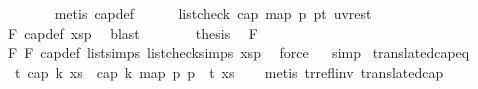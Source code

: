 \begin{isabellebody}
\ \ \ \ \ \ \isamarkupfalse%
\ {\isacharparenleft}{\kern0pt}metis\ cap{}{\isacharunderscore}{\kern0pt}def{\isacharparenright}{\kern0pt}\isanewline
\ \ \ \ \isamarkupfalse%
\ {\isachardoublequoteopen}list{\isacharunderscore}{\kern0pt}check\ cap{}\ {\isacharparenleft}{\kern0pt}map\ {\isacharparenleft}{\kern0pt}{\isasymlambda}p{\isachardot}{\kern0pt}\ p{\isacharplus}{\kern0pt}t{\isacharparenright}{\kern0pt}\ {\isacharparenleft}{\kern0pt}u{\isacharhash}{\kern0pt}v{\isacharhash}{\kern0pt}rest{\isacharparenright}{\kern0pt}{\isacharparenright}{\kern0pt}{\isachardoublequoteclose}\isanewline
\ \ \ \ \ \ \isamarkupfalse%
\ F{}\ cap{\isacharunderscore}{\kern0pt}def\ xsp\ \isamarkupfalse%
\ blast\isanewline
\ \ \ \ \isamarkupfalse%
\ \isamarkupfalse%
\ {\isacharquery}{\kern0pt}thesis\ \isamarkupfalse%
\ F{}\isanewline
\ \ \ \ \ \ \isamarkupfalse%
\ F{}\ F{}\ cap{\isacharunderscore}{\kern0pt}def\ list{\isachardot}{\kern0pt}simps{\isacharparenleft}{\kern0pt}{}{\isacharparenright}{\kern0pt}\ list{\isacharunderscore}{\kern0pt}check{\isachardot}{\kern0pt}simps{\isacharparenleft}{\kern0pt}{}{\isacharparenright}{\kern0pt}\ xsp\ \isamarkupfalse%
\ force\isanewline
\ \ \isamarkupfalse%
\isanewline
{}\isamarkupfalse%
{\isacharparenleft}{\kern0pt}simp{\isacharparenright}{\kern0pt}%
\endisatagproof
{\isafoldproof}%
%
\isadelimproof
%
\endisadelimproof
\isanewline
\isanewline
{}\isamarkupfalse%
\ translated{\isacharunderscore}{\kern0pt}cap{\isacharunderscore}{\kern0pt}eq{\isacharcolon}{\kern0pt}\isanewline
\ \ {\isachardoublequoteopen}{\isasymAnd}t{\isachardot}{\kern0pt}\ cap\ k\ xs\ {\isacharequal}{\kern0pt}\ cap\ k\ {\isacharparenleft}{\kern0pt}map\ {\isacharparenleft}{\kern0pt}{\isasymlambda}p{\isachardot}{\kern0pt}\ p\ {\isacharplus}{\kern0pt}\ t{\isacharparenright}{\kern0pt}\ xs{\isacharparenright}{\kern0pt}{\isachardoublequoteclose}\isanewline
%
\isadelimproof
\ \ %
\endisadelimproof
%
\isatagproof
{}\isamarkupfalse%
\ {\isacharparenleft}{\kern0pt}metis\ tr{\isacharunderscore}{\kern0pt}refl{\isacharunderscore}{\kern0pt}inv\ translated{\isacharunderscore}{\kern0pt}cap{\isacharparenright}{\kern0pt}%
\endisatagproof
{\isafoldproof}%
%
\isadelimproof
\isanewline
%
\endisadelimproof
\isanewline
\isanewline
\isanewline
{}\isamarkupfalse%

\end{isabellebody}
